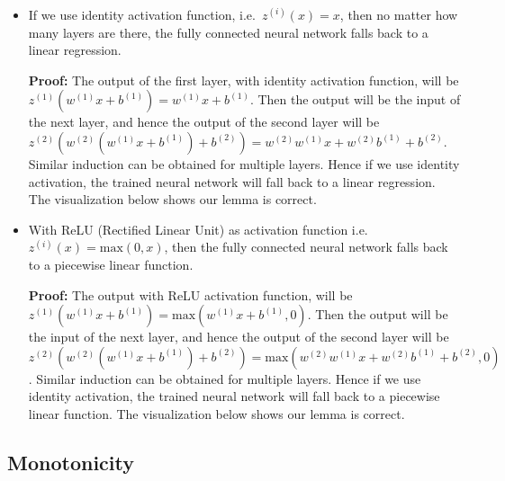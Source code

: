 \begin{itemize}
\item
  If we use identity activation function, i.e.~\(z^{(i)}(x)=x\), then no
  matter how many layers are there, the fully connected neural network
  falls back to a linear regression.

  \textbf{Proof:} The output of the first layer, with identity
  activation function, will be
  \(z^{(1)}(w^{(1)}x+b^{(1)})=w^{(1)}x+b^{(1)}\). Then the output will
  be the input of the next layer, and hence the output of the second
  layer will be
  \(z^{(2)}(w^{(2)}(w^{(1)}x+b^{(1)})+b^{(2)})=w^{(2)}w^{(1)}x+w^{(2)}b^{(1)}+b^{(2)}\).
  Similar induction can be obtained for multiple layers. Hence if we use
  identity activation, the trained neural network will fall back to a
  linear regression. The visualization below shows our lemma is correct.
\item
  With ReLU (Rectified Linear Unit) as activation function
  i.e.~\(z^{(i)}(x)=\text{max}(0,x)\), then the fully connected neural
  network falls back to a piecewise linear function.

  \textbf{Proof:} The output with ReLU activation function, will be
  \(z^{(1)}(w^{(1)}x+b^{(1)})=\text{max}(w^{(1)}x+b^{(1)}, 0)\). Then
  the output will be the input of the next layer, and hence the output
  of the second layer will be
  \(z^{(2)}(w^{(2)}(w^{(1)}x+b^{(1)})+b^{(2)})=\text{max}(w^{(2)}w^{(1)}x+w^{(2)}b^{(1)}+b^{(2)},0)\).
  Similar induction can be obtained for multiple layers. Hence if we use
  identity activation, the trained neural network will fall back to a
  piecewise linear function. The visualization below shows our lemma is
  correct.
\end{itemize}

\subsection{Monotonicity}